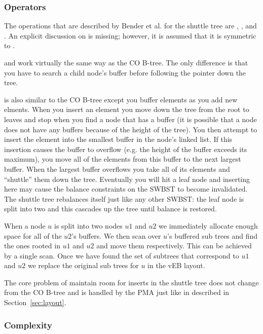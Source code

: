 \documentclass{style}
\begin{document}
\subsubsection{Operators}

The operations that are described by Bender et al. for the shuttle tree are
\Search, \Insert, and \Scan. An explicit discussion on \Delete is missing;
however, it is assumed that it is symmetric to \Insert.

\Search and \Scan work virtually the same way as the CO B-tree. The only
difference is that you have to search a child node's buffer before following
the pointer down the tree.

\Insert is also similar to the CO B-tree except you buffer elements as you add
new elments. When you insert an element you move down the tree from the root
to leaves and stop when you find a node that has a buffer (it is possible that
a node does not have any buffers because of the height of the tree). You then
attempt to insert the element into the smallest buffer in the node's linked
list. If this insertion causes the buffer to overflow (e.g. the height of the
buffer exceeds its maximum), you move all of the elements from this buffer to
the next largest buffer. When the largest buffer overflows you take all of its
elements and ``shuttle'' them down the tree. Eventually you will hit a leaf
node and inserting here may cause the balance constraints on the SWBST to
become invalidated. The shuttle tree rebalances itself just like any other
SWBST: the leaf node is split into two and this cascades up the tree until
balance is restored.

When a node $u$ is split into two nodes $u1$ and $u2$ we immediately allocate
enough space for all of the $u2$'s buffers. We then scan over $u$'s buffered
sub trees and find the ones rooted in $u1$ and $u2$ and move them
respectively. This can be achieved by a single scan. Once we have found the
set of subtrees that correspond to $u1$ and $u2$ we replace the original sub
trees for $u$ in the vEB layout.

The core problem of maintain room for inserts in the shuttle tree does not
change from the CO B-tree and is handled by the PMA just like in described in
Section~\ref{sec:layout}.

\subsubsection{Complexity}
\end{document}
